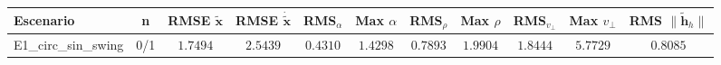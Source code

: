 \begin{tabular}{lcccccccccc}
\toprule
Escenario & n & RMSE $\tilde{\mathbf{x}}$ & RMSE $\dot{\tilde{\mathbf{x}}}$ & RMS$_\alpha$ & Max $\alpha$ & RMS$_\rho$ & Max $\rho$ & RMS$_{v_\perp}$ & Max $v_\perp$ & RMS $\|\tilde{\mathbf{h}}_h\|$ \\
\midrule
E1\_circ\_sin\_swing & 0/1 & $1.7494$ & $2.5439$ & $0.4310$ & $1.4298$ & $0.7893$ & $1.9904$ & $1.8444$ & $5.7729$ & $0.8085$ \\
\bottomrule
\end{tabular}
